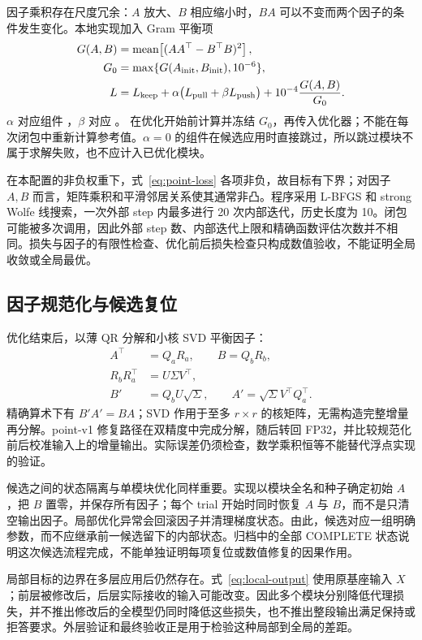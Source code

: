 因子乘积存在尺度冗余：$A$ 放大、$B$ 相应缩小时，$BA$ 可以不变而两个因子的条件发生变化。本地实现加入 Gram 平衡项
\begin{align}
 G(A,B)&=\operatorname{mean}\!\left[(AA^\top-B^\top B)^2\right],
 \label{eq:gram}\\
 G_0&=\max\{G(A_{\rm init},B_{\rm init}),10^{-6}\},\nonumber\\
 L&=L_{\rm keep}+\alpha\big(L_{\rm pull}+\beta L_{\rm push}\big)
       +10^{-4}\frac{G(A,B)}{G_0}.
 \label{eq:point-loss}
\end{align}
$\alpha$ 对应组件 ，$\beta$ 对应 。 在优化开始前计算并冻结 $G_0$，再传入优化器；不能在每次闭包中重新计算参考值。$\alpha=0$ 的组件在候选应用时直接跳过，所以跳过模块不属于求解失败，也不应计入已优化模块。

在本配置的非负权重下，式~\eqref{eq:point-loss} 各项非负，故目标有下界；对因子 $A,B$ 而言，矩阵乘积和平滑邻居关系使其通常非凸。程序采用 L-BFGS 和 strong Wolfe 线搜索，一次外部 step 内最多进行 20 次内部迭代，历史长度为 10。闭包可能被多次调用，因此外部 step 数、内部迭代上限和精确函数评估次数并不相同。损失与因子的有限性检查、优化前后损失检查只构成数值验收，不能证明全局收敛或全局最优。

\subsection{因子规范化与候选复位}

优化结束后，以薄 QR 分解和小核 SVD 平衡因子：
\begin{align}
 A^\top&=Q_aR_a,\qquad B=Q_bR_b,\nonumber\\
 R_bR_a^\top&=U\Sigma V^\top,\nonumber\\
 B'&=Q_bU\sqrt{\Sigma},\qquad
 A'=\sqrt{\Sigma}V^\top Q_a^\top.
 \label{eq:canonical}
\end{align}
精确算术下有 $B'A'=BA$；SVD 作用于至多 $r\times r$ 的核矩阵，无需构造完整增量再分解。point-v1 修复路径在双精度中完成分解，随后转回 FP32，并比较规范化前后校准输入上的增量输出。实际误差仍须检查，数学乘积恒等不能替代浮点实现的验证。

候选之间的状态隔离与单模块优化同样重要。实现以模块全名和种子确定初始 $A$，把 $B$ 置零，并保存所有因子；每个 trial 开始时同时恢复 $A$ 与 $B$，而不是只清空输出因子。局部优化异常会回滚因子并清理梯度状态。由此，候选对应一组明确参数，而不应继承前一候选留下的内部状态。归档中的全部 COMPLETE 状态说明这次候选流程完成，不能单独证明每项复位或数值修复的因果作用。

局部目标的边界在多层应用后仍然存在。式~\eqref{eq:local-output} 使用原基座输入 $X$；前层被修改后，后层实际接收的输入可能改变。因此多个模块分别降低代理损失，并不推出修改后的全模型仍同时降低这些损失，也不推出整段输出满足保持或拒答要求。外层验证和最终验收正是用于检验这种局部到全局的差距。
